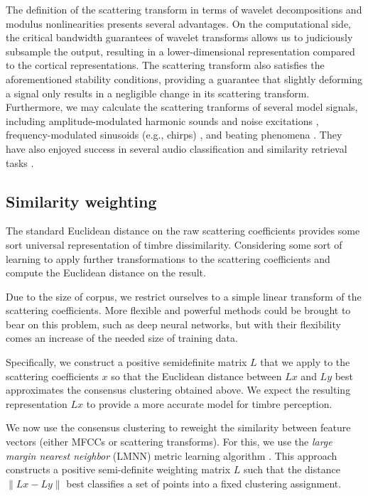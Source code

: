 \documentclass{bmcart}
\begin{document}
The definition of the scattering transform in terms of wavelet decompositions and modulus nonlinearities presents several advantages.
On the computational side, the critical bandwidth guarantees of wavelet transforms allows us to judiciously subsample the output, resulting in a lower-dimensional representation compared to the cortical representations.
The scattering transform also satisfies the aforementioned stability conditions, providing a guarantee that slightly deforming a signal only results in a negligible change in its scattering transform.
Furthermore, we may calculate the scattering tranforms of several model signals, including amplitude-modulated harmonic sounds and noise excitations \cite{anden2012scattering,anden2014deep}, frequency-modulated sinusoids (e.g., chirps) \cite{anden2012scattering,anden2019joint}, and beating phenomena \cite{anden2014deep}.
They have also enjoyed success in several audio classification and similarity retrieval tasks \cite{anden2011multiscale,bauge2013representing,anden2014deep,anden2019joint,lostanlen2018relevance,lostanlen2018extended}.

\subsection*{Similarity weighting}
\label{sec:weighting}

The standard Euclidean distance on the raw scattering coefficients  provides some sort universal representation of timbre dissimilarity. Considering some sort of learning to apply further transformations to the scattering coefficients and compute the Euclidean distance on the result.

Due to the size of corpus, we restrict ourselves to a simple linear transform of the scattering coefficients. More flexible and powerful methods could be brought to bear on this problem, such as deep neural networks, but with their flexibility comes an increase of the needed size of training data.

Specifically, we construct a positive semidefinite matrix $L$ that we apply to the scattering coefficients $x$ so that the Euclidean distance between $Lx$ and $Ly$ best approximates the consensus clustering obtained above.
We expect the resulting representation $Lx$ to provide a more accurate model for timbre perception.

We now use the consensus clustering to reweight the similarity between feature vectors (either MFCCs or scattering transforms).
For this, we use the \emph{large margin nearest neighbor} (LMNN) metric learning algorithm \cite{weinberger2006distance, weinberger2009distance}.
This approach constructs a positive semi-definite weighting matrix $L$ such that the distance $\|Lx - Ly\|$ best classifies a set of points into a fixed clustering assignment.
\end{document}
